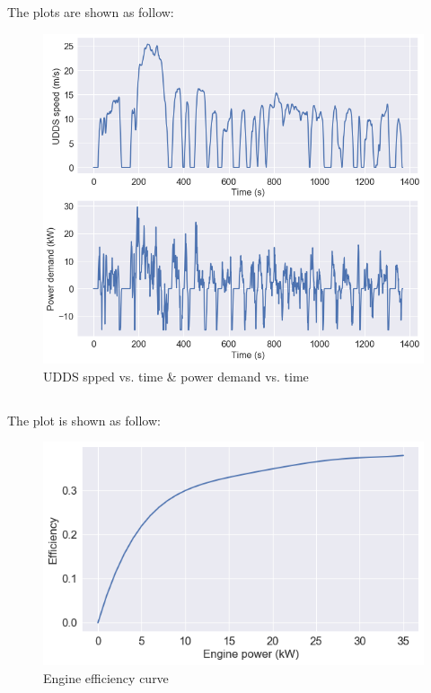 \documentclass[12pt]{article}
\begin{document}
\section{}
\subsection{}
The plots are shown as follow:
\begin{figure}[H]
	\centering
	\includegraphics[width=\linewidth]{4a.png}     
	\caption{UDDS spped vs. time \& power demand vs. time}
\end{figure}
\newpage
\subsection{}
The plot is shown as follow:
\begin{figure}[H]
	\centering
	\includegraphics[width=\linewidth]{4b.png}  
	\caption{Engine efficiency curve}
\end{figure}
\end{document}
